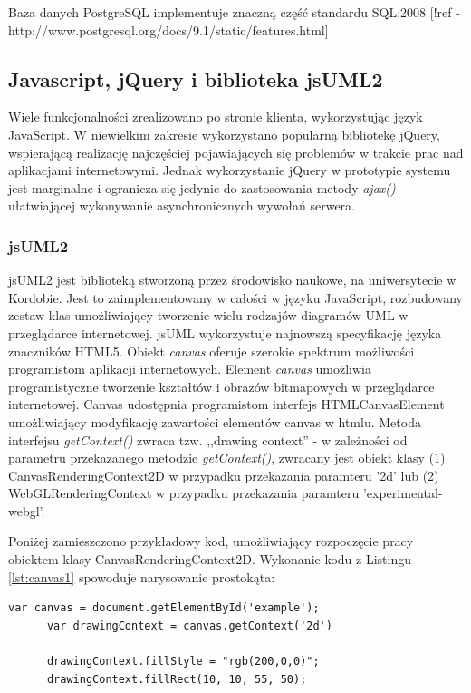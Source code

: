       Baza danych PostgreSQL implementuje znaczną część standardu SQL:2008 [!ref - http://www.postgresql.org/docs/9.1/static/features.html]

    \subsection{Javascript, jQuery i biblioteka jsUML2}

      Wiele funkcjonalności zrealizowano po stronie klienta, wykorzystując język JavaScript. W niewielkim zakresie wykorzystano popularną bibliotekę jQuery, wspierającą realizację najczęściej pojawiających się problemów w trakcie prac nad aplikacjami internetowymi. Jednak wykorzystanie jQuery w prototypie systemu jest marginalne i ogranicza się jedynie do zastosowania metody \emph{ajax()} ułatwiającej wykonywanie asynchronicznych wywołań serwera.

      \subsubsection{jsUML2}
        jsUML2 jest biblioteką stworzoną przez środowisko naukowe, na uniwersytecie w Kordobie. Jest to zaimplementowany w całości w języku JavaScript, rozbudowany zestaw klas umożliwiający tworzenie wielu rodzajów diagramów UML w przeglądarce internetowej. jsUML wykorzystuje najnowszą specyfikację języka znaczników HTML5. Obiekt \emph{canvas} oferuje szerokie spektrum możliwości programistom aplikacji internetowych. Element \emph{canvas} umożliwia programistyczne tworzenie kształtów i obrazów bitmapowych w przeglądarce internetowej. Canvas udostępnia programistom interfejs HTMLCanvasElement umożliwiający modyfikację zawartości elementów canvas w htmlu. Metoda interfejsu \emph{getContext()} zwraca tzw. ,,drawing context'' - w zależności od parametru przekazanego metodzie \emph{getContext()}, zwracany jest obiekt klasy (1) CanvasRenderingContext2D w przypadku przekazania paramteru '2d' lub (2) WebGLRenderingContext w przypadku przekazania paramteru 'experimental-webgl'.

        Poniżej zamieszczono przykładowy kod, umożliwiający rozpoczęcie pracy obiektem klasy CanvasRenderingContext2D. Wykonanie kodu z Listingu \ref{lst:canvas1} spowoduje narysowanie prostokąta:

      \begin{lstlisting}[caption={Przykład HTML5 canvas}, label={lst:canvas1}]
      var canvas = document.getElementById('example');
      var drawingContext = canvas.getContext('2d')

      drawingContext.fillStyle = "rgb(200,0,0)";  
      drawingContext.fillRect(10, 10, 55, 50);
      \end{lstlisting}


